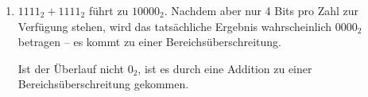 \documentclass{article}
\begin{document}
\begin{enumerate}[label=(\alph*)]
\item $1111_2 + 1111_2$ führt zu $10000_2$. Nachdem aber nur 4 Bits pro Zahl zur Verfügung stehen, wird das tatsächliche Ergebnis wahrscheinlich $0000_2$ betragen -- es kommt zu einer Bereichsüberschreitung.

Ist der Überlauf nicht $0_2$, ist es durch eine Addition zu einer Bereichs\-überschreitung gekommen.

\end{enumerate}
\end{document}
